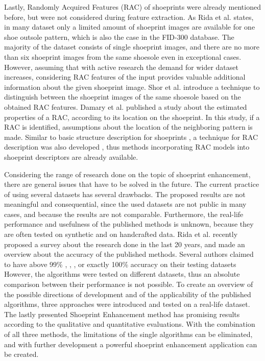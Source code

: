 \documentclass[draft,final]{vutinfth} %
\begin{document}
\par
Lastly, Randomly Acquired Features (RAC) of shoeprints were already mentioned before, but were not considered during feature extraction.
As Rida et al. \cite{rida2019forensic} states, in many dataset only a limited amount of shoeprint images are available for one shoe outsole pattern, which is also the case in the FID-300 database.
The majority of the dataset consists of single shoeprint images, and there are no more than six shoeprint images from the same shoesole even in exceptional cases.  
However, assuming that with active research the demand for wider dataset increases, considering RAC features of the input provides valuable additional information about the given shoeprint image. 
Shor et al. \cite{shor2018inherent} introduce a technique to distinguish between the shoeprint images of the same shoesole based on the obtained RAC features.
Damary et al. \cite{damary2018dependence} published a study about the estimated properties of a RAC, according to its location on the shoeprint.
In this study, if a RAC is identified, assumptions about the location of the neighboring pattern is made. 
Similar to basic structure description for shoeprints \cite{tang2010footwear}, a technique for RAC description was also developed \cite{speir2016quantifying}, thus methods incorporating RAC models into shoeprint descriptors are already available.
\par
Considering the range of research done on the topic of shoeprint enhancement, there are general issues that have to be solved in the future.
The current practice of using several datasets has several drawbacks.
The proposed results are not meaningful and consequential, since the used datasets are not public in many cases, and because the results are not comparable.
Furthermore, the real-life performance and usefulness of the published methods is unknown, because they are often tested on synthetic and on handcrafted data.
Rida et al. \cite{rida2019forensic} recently proposed a survey about the research done in the last 20 years, and made an overview about the accuracy of the published methods.
Several authors claimed to have above 99\% \cite{algarni2008novel}, \cite{alizadeh2017automatic}, \cite{almaadeed2015partial}, or exactly 100\% accuracy \cite{gueham2007automatic} on their testing datasets
However, the algorithms were tested on different datasets, thus an absolute comparison between their performance is not possible. 
To create an overview of the possible directions of development and of the applicability of the published algorithms, three approaches were introduced and tested on a real-life dataset.
The lastly presented Shoeprint Enhancement method has promising results according to the qualitative and quantitative evaluations.
With the combination of all three methods, the limitations of the single algorithms can be eliminated, and with further development a powerful shoeprint enhancement application can be created.
\end{document}
